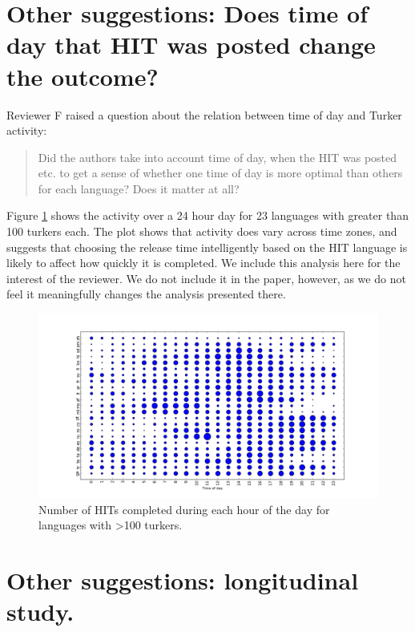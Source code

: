 \documentclass[11pt]{article}
\begin{document}
\section{Other suggestions: Does time of day that HIT was posted change the outcome?}

Reviewer F raised a question about the relation between time of day and Turker activity: 

\begin{quote}
Did the authors take into account time of day, when the HIT was posted etc. to get a sense of whether one time of day is more optimal than others for each language? Does it matter at all?
\end{quote}
Figure \ref{time} shows the activity over a 24 hour day for 23 languages with greater than 100 turkers each. The plot shows that activity does vary across time zones, and suggests that choosing the release time intelligently based on the HIT language is likely to affect how quickly it is completed. We include this analysis here for the interest of the reviewer. We do not include it in the paper, however, as we do not feel it meaningfully changes the analysis presented there. 

\begin{figure}
\centering
\includegraphics[height=.8\linewidth, angle=270]{figures/times.png}
\caption{Number of HITs completed during each hour of the day for languages with \textgreater 100 turkers.}
\label{time}
\end{figure}

\section{Other suggestions: longitudinal study. }
\end{document}
